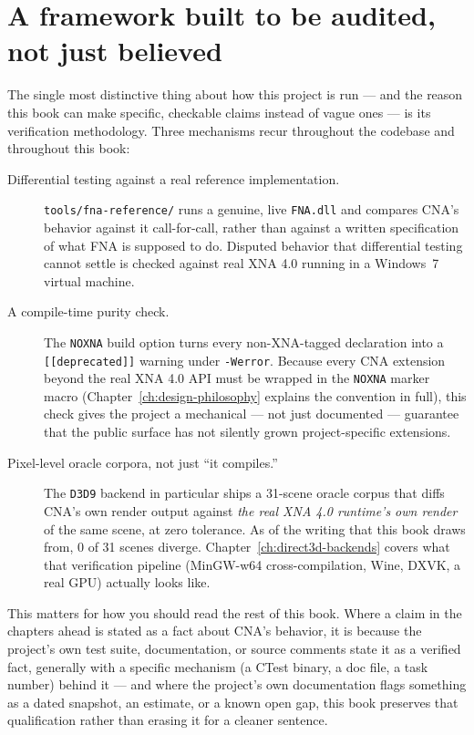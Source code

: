\section{A framework built to be audited, not just believed}

The single most distinctive thing about how this project is run --- and the reason this book
can make specific, checkable claims instead of vague ones --- is its verification
methodology. Three mechanisms recur throughout the codebase and throughout this book:

\begin{description}
  \item[Differential testing against a real reference implementation.] \texttt{tools/fna-reference/}
        runs a genuine, live \texttt{FNA.dll} and compares CNA's behavior against it
        call-for-call, rather than against a written specification of what FNA is supposed to
        do. Disputed behavior that differential testing cannot settle is checked against real
        XNA 4.0 running in a Windows~7 virtual machine.
  \item[A compile-time purity check.] The \texttt{NOXNA} build option turns every
        non-XNA-tagged declaration into a \texttt{[[deprecated]]} warning under
        \texttt{-Werror}. Because every CNA extension beyond the real XNA 4.0 API must be
        wrapped in the \texttt{NOXNA} marker macro (Chapter~\ref{ch:design-philosophy}
        explains the convention in full), this check gives the project a mechanical --- not
        just documented --- guarantee that the public 
        surface has not silently grown project-specific extensions.
  \item[Pixel-level oracle corpora, not just ``it compiles.''] The \texttt{D3D9} backend in
        particular ships a 31-scene oracle corpus that diffs CNA's own render output against
        \emph{the real XNA 4.0 runtime's own render} of the same scene, at zero tolerance. As
        of the writing that this book draws from, 0 of 31 scenes diverge. Chapter~\ref{ch:direct3d-backends}
        covers what that verification pipeline (MinGW-w64 cross-compilation, Wine, DXVK, a
        real GPU) actually looks like.
\end{description}

This matters for how you should read the rest of this book. Where a claim in the chapters
ahead is stated as a fact about CNA's behavior, it is because the project's own test suite,
documentation, or source comments state it as a verified fact, generally with a specific
mechanism (a CTest binary, a doc file, a task number) behind it --- and where the project's
own documentation flags something as a dated snapshot, an estimate, or a known open gap, this
book preserves that qualification rather than erasing it for a cleaner sentence.

